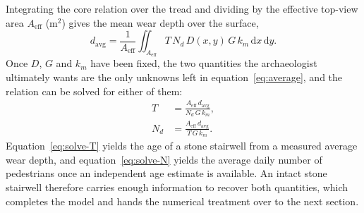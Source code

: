 Integrating the core relation over the tread and dividing by the effective top-view area $A_{\text{eff}}$ (m$^2$) gives the mean wear depth over the surface,
\begin{equation}
d_{\text{avg}} = \frac{1}{A_{\text{eff}}}\iint_{A_{\text{eff}}} T\, N_d\, D(x,y)\, G\, k_m \,\mathrm{d}x\,\mathrm{d}y .
\label{eq:average}
\end{equation}
Once $D$, $G$ and $k_m$ have been fixed, the two quantities the archaeologist ultimately wants are the only unknowns left in equation~\eqref{eq:average}, and the relation can be solved for either of them:
\begin{align}
T   &= \frac{A_{\text{eff}}\, d_{\text{avg}}}{N_d\, G\, k_m}, \label{eq:solve-T}\\
N_d &= \frac{A_{\text{eff}}\, d_{\text{avg}}}{T\, G\, k_m}. \label{eq:solve-N}
\end{align}
Equation~\eqref{eq:solve-T} yields the age of a stone stairwell from a measured average wear depth, and equation~\eqref{eq:solve-N} yields the average daily number of pedestrians once an independent age estimate is available. An intact stone stairwell therefore carries enough information to recover both quantities, which completes the model and hands the numerical treatment over to the next section.
